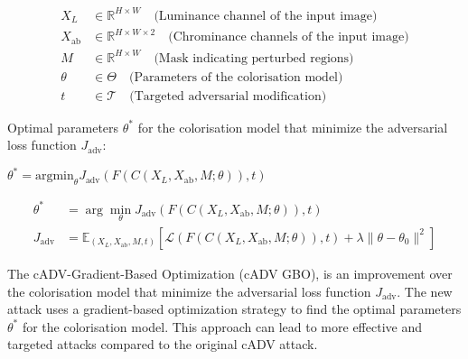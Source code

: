 \begin{align*}
X_L &\in \mathbb{R}^{H \times W}  \quad \text{(Luminance channel of the input image)} \\
X_{\text{ab}} &\in \mathbb{R}^{H \times W \times 2} \quad \text{(Chrominance channels of the input image)} \\
M &\in \mathbb{R}^{H \times W}  \quad \text{(Mask indicating perturbed regions)} \\
\theta &\in \Theta  \quad \text{(Parameters of the colorisation model)} \\
t &\in \mathcal{T}  \quad \text{(Targeted adversarial modification)} 
\end{align*}

Optimal parameters $\theta^*$ for the colorisation model that minimize the adversarial loss function $J_{\text{adv}}$:

$\theta^* = \text{argmin}_\theta J_{\text{adv}} \left(F \left(C(X_L, X_{\text{ab}}, M; \theta)\right), t \right)$

\begin{align*}
\theta^* &= \arg\min_{\theta} J_{\text{adv}} \left(F \left(C(X_L, X_{\text{ab}}, M; \theta)\right), t \right) \\
J_{\text{adv}} &= \mathbb{E}_{(X_L, X_{\text{ab}}, M, t)} \left[ \mathcal{L} \left(F \left(C(X_L, X_{\text{ab}}, M; \theta)\right), t \right) + \lambda \|\theta - \theta_0\|^2 \right]
\end{align*}

The cADV-Gradient-Based Optimization (cADV GBO), is an improvement over the colorisation model that minimize the adversarial loss function $J_{\text{adv}}$. The new attack uses a gradient-based optimization strategy to find the optimal parameters $\theta^*$ for the colorisation model. This approach can lead to more effective and targeted attacks compared to the original cADV attack.